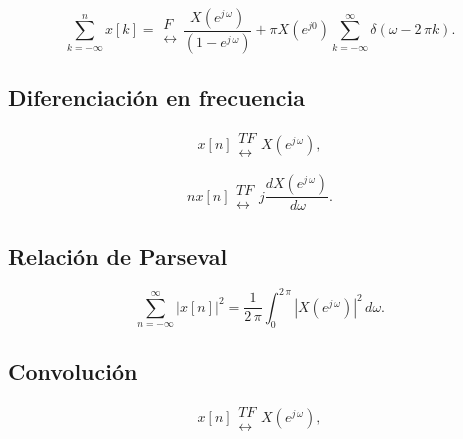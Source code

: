 \begin{equation}
\sum_{k=-\infty }^nx\left[ k\right] = 
\begin{array}{l}
F \\ 
\leftrightarrow
\end{array}
\frac{X\left( e^{j \, \omega }\right) }{\left( 1-e^{j \, \omega }\right) }+\pi
X\left( e^{j0}\right) \sum_{k=-\infty }^{\infty }\delta \left( \omega -2 \, \pi
k\right) .
\end{equation}

\subsection{Diferenciaci\'{o}n en frecuencia}

\begin{equation}
x\left[ n\right] 
\begin{array}{l}
TF \\ 
\leftrightarrow
\end{array}
X\left( e^{j \, \omega }\right) ,
\end{equation}

\begin{equation}
nx\left[ n\right] 
\begin{array}{l}
TF \\ 
\leftrightarrow
\end{array}
j\frac{dX\left( e^{j \, \omega }\right) }{\, d\omega }.
\end{equation}

\subsection{Relaci\'{o}n de Parseval}

\begin{equation}
\sum_{n=-\infty }^{\infty }\left| x\left[ n\right] \right| ^{2}=
\frac{1}{2 \, \pi }
\int_{0}^{2 \, \pi }\left| X\left( e^{j \, \omega }\right) \right| ^{2}\, d\omega.
\end{equation}

\subsection{Convoluci\'{o}n}

\begin{equation}
x\left[ n\right] 
\begin{array}{l}
TF \\ 
\leftrightarrow
\end{array}
X\left( e^{j \, \omega }\right) ,
\end{equation}

